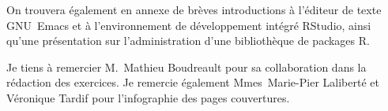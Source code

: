 On trouvera également en annexe de brèves introductions à l'éditeur de
texte GNU~Emacs et à l'environnement de développement intégré RStudio,
ainsi qu'une présentation sur l'administration d'une bibliothèque de
packages R.

Je tiens à remercier M.~Mathieu Boudreault pour sa collaboration dans
la rédaction des exercices. Je remercie également Mmes~Marie-Pier
Laliberté et Véronique Tardif pour l'infographie des pages
couvertures.

